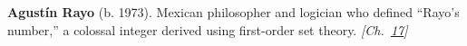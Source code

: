 \textbf{Agustín Rayo} (b. 1973). Mexican philosopher and logician who defined ``Rayo's number,'' a colossal integer derived using first-order set theory. \emph{[Ch.~\hyperref[ch:bignumbers]{17}]}

